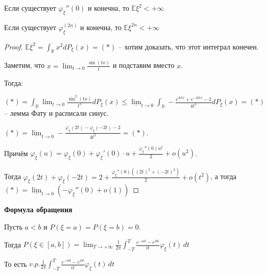 \begin{theorem}
    Если существует $\varphi_{\xi}''(0)$ и конечна, то $\mathbb{E} \xi^2 < +\infty$
\end{theorem}

\begin{remark}
    Если существует $\varphi_{\xi}^{(2n)}$ и конечна, то $\mathbb{E} \xi^{2n} < +\infty$
\end{remark}

\begin{proof}
    $\mathbb{E} \xi^2 = \int_{\mathbb{R}} x^2 dP_{\xi} (x) = (*)$ -- хотим доказать, что этот интеграл конечен.

    Заметим, что $x = \lim_{t \to 0} \frac{\sin (tx)}{t}$ и подставим вместо $x$.
    
    Тогда:

    $(*) = \int_{\mathbb{R}} \lim_{t \to 0} \frac{\sin^2 (tx)}{t^2} dP_{\xi}(x) \leqslant
    \underline{\lim}_{t \to 0} \int_{\mathbb{R}} -\frac{e^{2itx} + e^{-2itx} - 2}{4t^2} dP_{\xi} (x) = (*)$ -- лемма Фату и расписали синус.

    $(*) = \underline{\lim}_{t \to 0} -\frac{\varphi_{\xi}(2t) - \varphi_{\xi}(-2t) - 2}{4t^2} = (*)$.
    
    Причём $\varphi_{\xi} (u) = \varphi_{\xi}(0) + \varphi_{\xi}'(0) \cdot u + \frac{\varphi_{\xi}''(0) u^2}{2} + o(u^2)$.

    Тогда $\varphi_{\xi}(2t) + \varphi_{\xi}(-2t) = 2 + \frac{\varphi_{\xi}''(0) \left((2t)^2 + (-2t)^2 \right)}{2} + o(t^2)$, а тогда $(*) = \underline{\lim}_{t \to 0} (-\varphi_{\xi}''(0) + o(1))$
\end{proof}

\begin{theorem}
    \textbf{Формула обращения}

    Пусть $a < b$ и $P(\xi = a) = P(\xi = b) = 0$.

    Тогда $P(\xi \in [a, b]) = \lim_{T \to +\infty} \frac{1}{2\pi} \int_{-T}^{T} \frac{e^{-iat} - e^{ibt}}{it} \varphi_{\xi}(t) \, dt $

    То есть $v.p. \frac{1}{2\pi} \int_{-T}^{T} \frac{e^{-iat} - e^{ibt}}{it} \varphi_{\xi}(t) \, dt$
\end{theorem}

